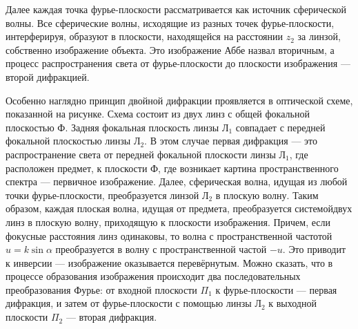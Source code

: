 Далее каждая точка фурье-плоскости рассматривается как источник сферической волны. Все сферические волны, исходящие из разных точек фурье-плоскости, интерферируя, образуют в плоскости, находящейся на расстоянии $z_2$ за линзой, собственно изображение объекта. Это изображение Аббе назвал вторичным, а процесс распространения света от фурье-плоскости до плоскости изображения --- второй дифракцией.

\begin{figure}[ht!]
\end{figure}

Особенно наглядно принцип двойной дифракции проявляется в оптической схеме, показанной на рисунке. Схема состоит из двух линз с общей фокальной плоскостью Ф. Задняя фокальная плоскость линзы $\text{Л}_1$ совпадает с передней фокальной плоскостью линзы $\text{Л}_2$. В этом случае первая дифракция --- это распространение света от передней фокальной плоскости линзы $\text{Л}_1$, где расположен предмет, к плоскости Ф, где возникает картина пространственного спектра --- первичное изображение. Далее, сферическая волна, идущая из любой точки фурье-плоскости, преобразуется линзой $\text{Л}_2$ в плоскую волну. Таким образом, каждая плоская волна, идущая от предмета, преобразуется системойдвух линз в плоскую волну, приходящую к плоскости изображения. Причем, если фокусные расстояния линз одинаковы, то волна с пространственной частотой $u = k\sin\alpha$ преобразуется в волну с пространственной частой $-u$. Это приводит к инверсии --- изображение оказывается перевёрнутым. Можно сказать, что в процессе образования изображения происходит два последовательных преобразования Фурье: от входной плоскости $\Pi_1$ к фурье-плоскости --- первая дифракция, и затем от фурье-плоскости с помощью линзы $\text{Л}_2$ к выходной плоскости $\Pi_2$ --- вторая дифракция.


